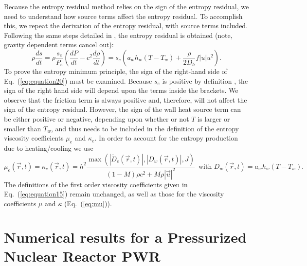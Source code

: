 \documentclass[12pt]{article}
\newcommand{\eqt}[1]{Eq.~(\ref{#1})} %
\begin{document}
Because the entropy residual method relies on the sign of the entropy residual, we need to understand how source terms affect the entropy residual. To accomplish this, we repeat the derivation of the entropy residual, with source terms included. Following the same steps detailed in \cite{jlg}, the entropy residual is obtained (note, gravity dependent terms cancel out):
\begin{equation}
\label{eq:equation20}
\rho \frac{ds}{dt} = \rho \frac{s_e}{P_e}\left( \frac{dP}{dt} - c^2 \frac{d \rho}{dt} \right) = s_e \left( a_w h_w (T - T_w) + \frac{\rho}{2 D_h} f |u| u^2 \right) .
\end{equation}
To prove the entropy minimum principle, the sign of the right-hand side of \eqt{eq:equation20} must be examined. Because $s_e$ is positive by definition \cite{jlg}, the sign of the right hand side will depend upon the terms inside the brackets. We observe that the friction term is always positive and, therefore, will not affect the sign of the entropy residual. However, the sign of the wall heat source term can be either positive or negative, depending upon whether or not $T$ is larger or smaller than $T_w$, and thus needs to be included in the definition of the entropy viscosity coefficients $\mu_e$ and $\kappa_e$. In order to account for the entropy production due to heating/cooling we use
\begin{equation}
\label{eq:equation21}
\mu_e(\vec{r},t) = \kappa_e(\vec{r},t) = h^2 \frac{\max\left( | \tilde{D}_e(\vec{r},t) |, | D_w(\vec{r},t) |, J \right)}{(1-M) \rho c^2 + M \rho |\vec{u}|^2} \, \text{ with } D_w(\vec{r},t) = a_w h_w (T - T_w).
\end{equation}
The definitions of the first order viscosity coefficients given in \eqt{eq:equation15} remain unchanged, as well as those for the viscosity coefficients $\mu$ and $\kappa$ (\eqt{eq:mu}).

%
\section{Numerical results for a Pressurized Nuclear Reactor PWR}
\label{sec:results}
\end{document}
